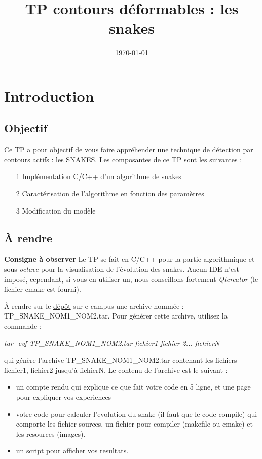 \documentclass[10pt,a4paper]{article}
\title{TP contours d\'{e}formables : les snakes}
\author{} %
\date{\today}
\begin{document}
\maketitle

\section{Introduction} 

\subsection{Objectif}
Ce TP a pour objectif de vous faire appr\'{e}hender une technique de d\'{e}tection par contours actifs : les SNAKES. Les composantes de ce TP sont les suivantes :
\begin{itemize}
	\item[1] Impl\'{e}mentation C/C++ d'un algorithme de snakes
	\item[2] Caract\'{e}risation de l'algorithme en fonction des param\`{e}tres
	\item[3] Modification du mod\`{e}le
\end{itemize}

\subsection{\`{A} rendre}

\noindent\textbf{Consigne \`{a} observer} Le TP se fait en C/C++ pour la partie algorithmique et sous \textit{octave} pour la visualisation de l'\'{e}volution des snakes. Aucun IDE n'est impos\'{e}, cependant, si vous en utiliser un, nous conseillons fortement \textit{Qtcreator} (le fichier cmake est fourni).


\`{A} rendre sur le \href{https://e-campus.cpe.fr/mod/assignment/view.php?id=16984}{d\'{e}p\^{o}t} sur e-campus une archive nomm\'{e}e : TP\_SNAKE\_NOM1\_NOM2.tar. Pour g\'{e}n\'{e}rer cette archive, utilisez la commande : 
\begin{center} 
	\textit{tar -cvf TP\_SNAKE\_NOM1\_NOM2.tar fichier1 fichier 2... fichierN}
\end{center}
qui g\'{e}n\`{e}re l'archive TP\_SNAKE\_NOM1\_NOM2.tar contenant les fichiers fichier1, fichier2 jusqu'\`a fichierN. Le contenu de l'archive est le suivant : 
\begin{itemize}
	\item un compte rendu qui explique ce que fait votre code en 5 ligne, et une page pour expliquer vos experiences
	\item votre code pour calculer l'evolution du snake (il faut que le code compile) qui comporte les fichier sources, un fichier pour compiler (makefile ou cmake) et les resources (images).
	\item un script pour afficher vos resultats.
\end{itemize}
\end{document}

